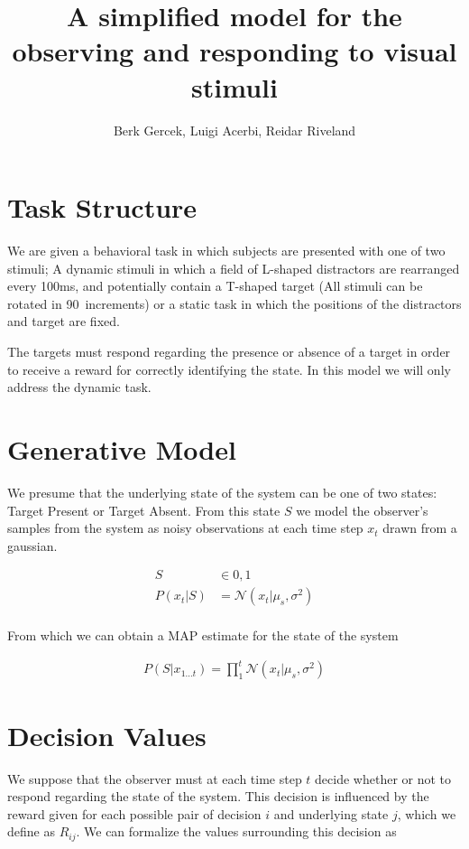 \documentclass[12pt]{article}
\begin{document}
\title{A simplified model for the observing and responding to visual stimuli}
\author{Berk Gercek, Luigi Acerbi, Reidar Riveland}
\maketitle
\section{Task Structure}
We are given a behavioral task in which subjects are presented with one of two stimuli; A dynamic stimuli in which a field of L-shaped distractors are rearranged every 100ms, and potentially contain a T-shaped target (All stimuli can be rotated in 90\degree \ increments) or a static task in which the positions of the distractors and target are fixed.

The targets must respond regarding the presence or absence of a target in order to receive a reward for correctly identifying the state. In this model we will only address the dynamic task.

\section{Generative Model}
We presume that the underlying state of the system can be one of two states: Target Present or Target Absent. From this state $S$ we model the observer's samples from the system as noisy observations at each time step $x_t$ drawn from a gaussian.

\begin{align*}
S &\in {0, 1} \\
P(x_t | S) &= \mathcal{N}(x_t | \mu_s, \sigma^2)\\
\end{align*} 

From which we can obtain a MAP estimate for the state of the system

\begin{align}
P(S | x_{1 \dots t}) = \prod_1^t \mathcal{N}(x_t | \mu_s, \sigma^2)
\end{align}

\section{Decision Values}
We suppose that the observer must at each time step $t$ decide whether or not to respond regarding the state of the system. This decision is influenced by the reward given for each possible pair of decision $i$ and underlying state $j$, which we define as $R_{ij}$. We can formalize the values surrounding this decision as
\end{document}
